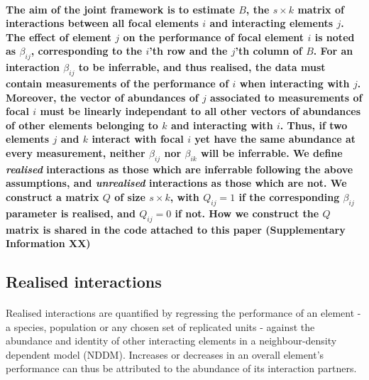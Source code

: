 \documentclass[a4,12pt]{article}
\begin{document}
    \paragraph{}
    \textbf{
    The aim of the joint framework is to estimate $B$, the $s \times k$ matrix of interactions between all focal elements $i$ and interacting elements $j$. The effect of element $j$ on the performance of focal element $i$ is noted as $\beta_{ij}$, corresponding to the $i$'th row and the $j$'th column of $B$. 
    For an interaction $\beta_{ij}$ to be inferrable, and thus realised, the data must contain measurements of the performance of $i$ when interacting with $j$. Moreover, the vector of abundances of $j$ associated to measurements of focal $i$ must be linearly independant to all other vectors of abundances of other elements  belonging to $k$ and interacting with $i$. Thus, if two elements $j$ and $k$ interact with focal $i$ yet have the same abundance at every measurement, neither $\beta_{ij}$ nor $\beta_{ik}$ will be inferrable. We define \textit{realised} interactions as those which are inferrable following the above assumptions, and \textit{unrealised} interactions as those which are not. We construct a matrix $Q$ of size $s \times k$, with $Q_{ij} = 1$ if the corresponding $\beta_{ij}$ parameter is realised, and $Q_{ij} = 0$ if not. How we construct the $Q$ matrix is shared in the code attached to this paper (Supplementary Information XX)}

    
    \subsection{Realised interactions}
    \label{meth:nddm}    

        \paragraph{}
        Realised interactions are quantified by regressing the performance of an element  - a species, population or any chosen set of replicated units - against the abundance and identity of other interacting elements in a neighbour-density dependent model (NDDM).  Increases or decreases in an overall element's performance can thus be attributed to the abundance of its interaction partners. 
\end{document}

